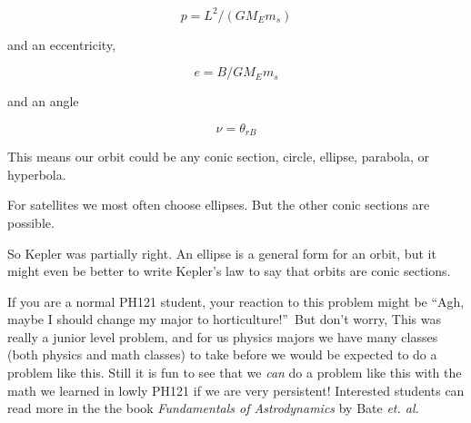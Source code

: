 $$p=L^{2}/\left( GM_{E}m_{s}\right) $$

and an eccentricity, 
 
$$e=B/GM_{E}m_{s}$$

and an angle 

$$\nu =\theta _{rB}$$

This means our orbit could be any conic section, circle, ellipse, parabola, or hyperbola.

For satellites we most often choose ellipses. But the other conic sections are possible.

So Kepler was partially right. An ellipse is a general form for an orbit, but it might even be better to write Kepler's law to say that orbits are conic sections.


If you are a normal PH121 student, your reaction to this problem might be \textquotedblleft Agh, maybe I should change my major to
horticulture!\textquotedblright\ But don't worry, This was really a junior level problem, and for us physics majors we have many classes (both physics and math classes) to take before we would be expected to do a problem like this. Still it is fun to see that we \emph{can} do a problem like this with the math we learned in lowly PH121 if we are very persistent!  Interested students can read more in the the book \textit{Fundamentals of Astrodynamics} by Bate \textit{et. al.} \cite{Bate1971}\cite{ExplainingComputers2021}\cite{byuiphysics}\cite{Acquista76}
	
